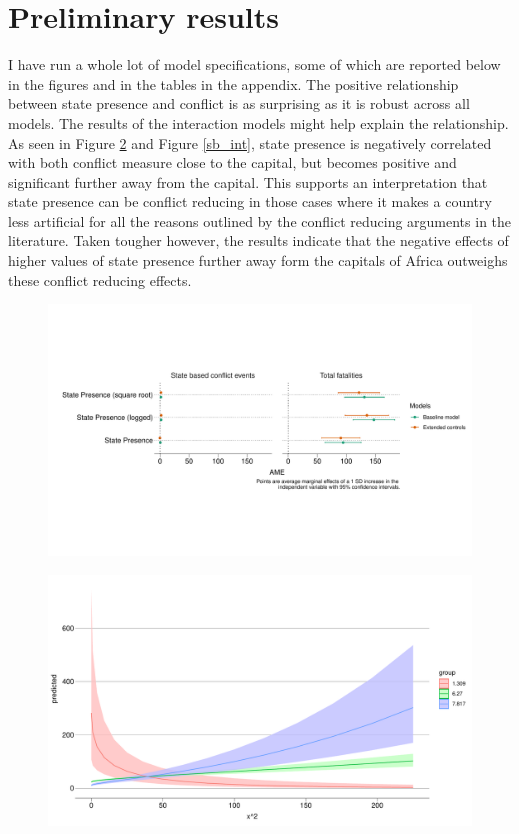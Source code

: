 \documentclass[12pt]{article}
\begin{document}
\section{Preliminary results}

I have run a whole lot of model specifications, some of which are reported below
in the figures and in the tables in the appendix. The positive relationship
between state presence and conflict is as surprising as it is robust across all
models. The results of the interaction models might help explain the
relationship. As seen in Figure \ref{deaths_int} and Figure \ref{sb_int}, state
presence is negatively correlated with both conflict measure close to the
capital, but becomes positive and significant further away from the capital.
This supports an interpretation that state presence can be conflict reducing in
those cases where it makes a country less artificial for all the reasons
outlined by the conflict reducing arguments in the literature. Taken tougher
however, the results indicate that the negative effects of higher values of
state presence further away form the capitals of Africa outweighs these conflict
reducing effects. 


\begin{figure}[htpb]
	\centering
	\includegraphics[width=\linewidth]{"../R/Output/conflictMargins.pdf"}
	\caption{}
	\label{margins}
\end{figure}

\begin{figure}[htpb]
	\centering
	\includegraphics[width=\linewidth]{"../R/Output/deathsIntPlot.pdf"}
	\caption{}
	\label{deaths_int}
\end{figure}
\end{document}

